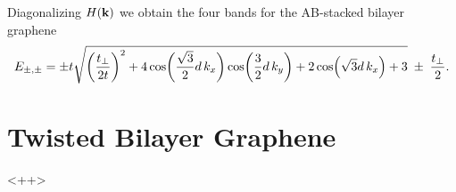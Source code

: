 \documentclass[a4paper,10pt]{article}
\begin{document}
Diagonalizing $H(\vb{k})$ we obtain the four bands for the AB-stacked bilayer graphene
\begin{equation} \label{eq:ab-four_bands}
E_{\pm,\pm} = \pm t
\sqrt{
\qty(\frac{t_\perp}{2t})^2 +
4 \cos(\frac{\sqrt{3}}{2} d \, k_x) \cos(\frac{3}{2} d \, k_y) + 2 \cos(\sqrt{3} d \, k_x) + 3
}
\; \pm \; \frac{t_\perp}{2}.
\end{equation}

\section{Twisted Bilayer Graphene}

<++>

%


\end{document}
